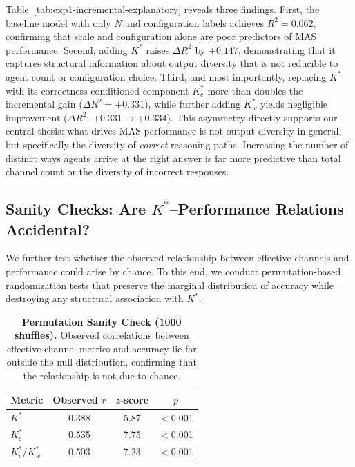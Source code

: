 \documentclass{article}
\theoremstyle{plain}
\theoremstyle{definition}
\theoremstyle{remark}
\begin{document}
Table~\ref{tab:exp1-incremental-explanatory} reveals three findings.
First, the baseline model with only $N$ and configuration labels achieves $R^2 = 0.062$, confirming that scale and configuration alone are poor predictors of MAS performance.
Second, adding $K^*$ raises $\Delta R^2$ by $+0.147$, demonstrating that it captures structural information about output diversity that is not reducible to agent count or configuration choice.
Third, and most importantly, replacing $K^*$ with its correctness-conditioned component $K^*_c$ more than doubles the incremental gain ($\Delta R^2 = +0.331$), while further adding $K^*_w$ yields negligible improvement ($\Delta R^2$: $+0.331 \to +0.334$).
This asymmetry directly supports our central thesis: what drives MAS performance is not output diversity in general, but specifically the diversity of \emph{correct} reasoning paths. Increasing the number of distinct ways agents arrive at the right answer is far more predictive than total channel count or the diversity of incorrect responses.


\subsection{Sanity Checks: Are $K^*$--Performance Relations Accidental?}
\label{sec:kstar_sanity}

We further test whether the observed relationship between effective channels
and performance could arise by chance.
To this end, we conduct permutation-based randomization tests that preserve
the marginal distribution of accuracy while destroying any structural
association with $K^*$.


\begin{table}[h]
\centering
\caption{\textbf{Permutation Sanity Check (1000 shuffles).}
Observed correlations between effective-channel metrics and accuracy lie far
outside the null distribution, confirming that the relationship is not due to chance.}
\label{tab:exp3-permutation}
\setlength{\tabcolsep}{6pt}
\begin{tabular}{lccc}
\toprule
\textbf{Metric} & \textbf{Observed $r$} & \textbf{$z$-score} & \textbf{$p$} \\
\midrule
$K^*$            & 0.388 & 5.87 & $<$0.001 \\
$K^*_c$          & 0.535 & 7.75 & $<$0.001 \\
$K^*_c/K^*_w$    & 0.503 & 7.23 & $<$0.001 \\
\bottomrule
\end{tabular}
\end{table}
\end{document}
